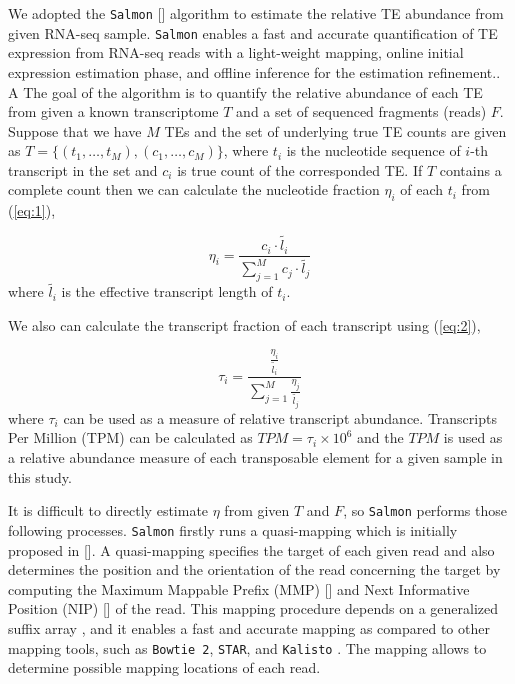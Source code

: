 \documentclass[wsdraft]{ws-procs11x85}
\begin{document}
We adopted the \texttt{Salmon} [] algorithm to estimate the relative TE abundance from given RNA-seq sample. \texttt{Salmon} enables a fast and accurate quantification of TE expression from RNA-seq reads with a light-weight mapping, online initial expression estimation phase, and offline inference for the estimation refinement.\cite{patro2017salmon,srivastava2016rapmap,bishop2006pattern,foulds2013stochastic}. A The goal of the algorithm is to quantify the relative abundance of each TE from given a known transcriptome $T$ and a set of sequenced fragments (reads) $F$.
Suppose that we have $M$ TEs and the set of underlying true TE counts are given as $T = \{(t_1, \dots , t_M), (c_1, \dots, c_M) \}$, where $t_i$ is the nucleotide sequence of $i$-th transcript in the set and $c_i$ is true count of the corresponded TE. If $T$ contains a complete count then we can calculate the nucleotide fraction $\eta_i$ of each $t_i$ from (\ref{eq:1}),

\begin{equation} \label{eq:1}
\eta_i = \frac{c_i \cdot \widetilde{l_i} }{\sum_{j=1}^{M} c_j \cdot \widetilde{l_j}}
\end{equation}
where $\widetilde{l_i}$ is the effective transcript length of $t_i$\cite{li2009rna}.

We also can calculate the transcript fraction of each transcript using (\ref{eq:2}),

\begin{equation} \label{eq:2}
\tau_i = \frac{ \frac{\eta_i }{\widetilde{l_i}} }
{\sum_{j=1}^{M} \frac{\eta_j }{\widetilde{l_j}} }
\end{equation}
where $\tau_i$ can be used as a measure of relative transcript abundance. Transcripts Per Million (TPM) can be calculated as $TPM=\tau_i \times 10^6$ and the $TPM$ is used as a relative abundance measure of each transposable element for a given sample in this study. 

It is difficult to directly estimate $\eta$ from given $T$ and $F$, so \texttt{Salmon} performs those following processes.
\texttt{Salmon} firstly runs a quasi-mapping which is initially proposed in []. A quasi-mapping specifies the target of each given read and also determines the position and the orientation of the read concerning the target by computing the
Maximum Mappable Prefix (MMP) [] and Next Informative Position (NIP) [] of the read.
This mapping procedure depends on a generalized suffix array \cite{manber1993suffix},  and it enables a fast and accurate mapping as compared to other mapping tools, such as \texttt{Bowtie 2}, \texttt{STAR}, and \texttt{Kalisto} \cite{srivastava2016rapmap}. The mapping allows to determine possible mapping locations of each read.
\end{document}
